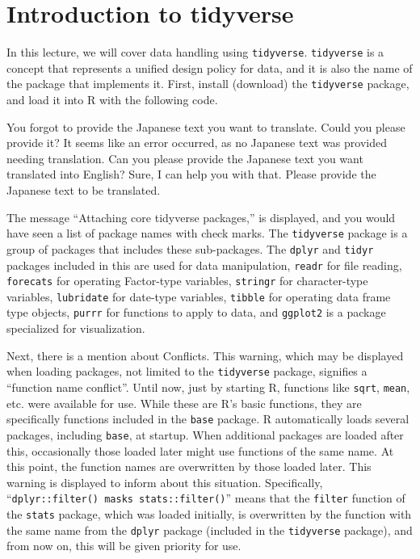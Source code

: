 \documentclass[
  a4paper,
]{book}
\begin{document}
\section{Introduction to tidyverse}\label{introduction-to-tidyverse}

In this lecture, we will cover data handling using \texttt{tidyverse}.
\texttt{tidyverse} is a concept that represents a unified design policy
for data, and it is also the name of the package that implements it.
First, install (download) the \texttt{tidyverse} package, and load it
into R with the following code.

You forgot to provide the Japanese text you want to translate. Could you
please provide it? It seems like an error occurred, as no Japanese text
was provided needing translation. Can you please provide the Japanese
text you want translated into English? Sure, I can help you with that.
Please provide the Japanese text to be translated.

The message ``Attaching core tidyverse packages,'' is displayed, and you
would have seen a list of package names with check marks. The
\texttt{tidyverse} package is a group of packages that includes these
sub-packages. The \texttt{dplyr} and \texttt{tidyr} packages included in
this are used for data manipulation, \texttt{readr} for file reading,
\texttt{forecats} for operating Factor-type variables, \texttt{stringr}
for character-type variables, \texttt{lubridate} for date-type
variables, \texttt{tibble} for operating data frame type objects,
\texttt{purrr} for functions to apply to data, and \texttt{ggplot2} is a
package specialized for visualization.

Next, there is a mention about Conflicts. This warning, which may be
displayed when loading packages, not limited to the \texttt{tidyverse}
package, signifies a ``function name conflict''. Until now, just by
starting R, functions like \texttt{sqrt}, \texttt{mean}, etc. were
available for use. While these are R's basic functions, they are
specifically functions included in the \texttt{base} package. R
automatically loads several packages, including \texttt{base}, at
startup. When additional packages are loaded after this, occasionally
those loaded later might use functions of the same name. At this point,
the function names are overwritten by those loaded later. This warning
is displayed to inform about this situation. Specifically,
``\texttt{dplyr::filter()\ masks\ stats::filter()}'' means that the
\texttt{filter} function of the \texttt{stats} package, which was loaded
initially, is overwritten by the function with the same name from the
\texttt{dplyr} package (included in the \texttt{tidyverse} package), and
from now on, this will be given priority for use.
\end{document}
